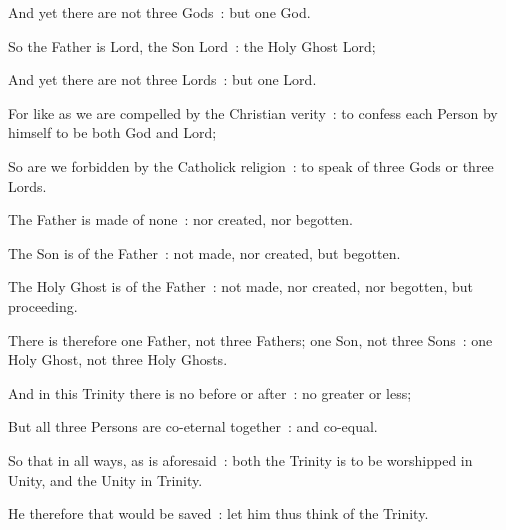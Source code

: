 {    And yet there are not three Gods~: but one God.\par
    So the Father is Lord, the Son Lord~: the Holy Ghost Lord;\par
    And yet there are not three Lords~: but one Lord.\par
    For like as we are compelled by the Christian verity~: to confess each Person by himself to be both God and Lord;\par
    So are we forbidden by the Catholick religion~: to speak of three Gods or three Lords.\par
    The Father is made of none~: nor created, nor begotten.\par
    The Son is of the Father~: not made, nor created, but begotten.\par
    The Holy Ghost is of the Father~: not made, nor created, nor begotten, but proceeding.\par
    There is therefore one Father, not three Fathers; one Son, not three Sons~: one Holy Ghost, not three Holy Ghosts.\par
    And in this Trinity there is no before or after~: no greater or less;\par
    But all three Persons are co-eternal together~: and co-equal.\par
    So that in all ways, as is aforesaid~: both the Trinity is to be worshipped in Unity, and the Unity in Trinity.\par
    He therefore that would be saved~: let him thus think of the Trinity.

}
